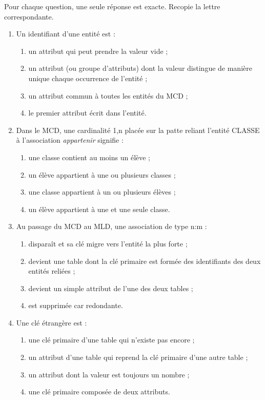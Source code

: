 \documentclass[11pt]{article}
\newcommand{\cle}[1]{{\popxbold\color{popdark}#1}}
\begin{document}
\begin{exercice}
Pour chaque question, une seule réponse est exacte. Recopie la lettre correspondante.

\begin{enumerate}
  \item Un \cle{identifiant} d'une entité est :
  \begin{enumerate}
    \item un attribut qui peut prendre la valeur vide ;
    \item un attribut (ou groupe d'attributs) dont la valeur distingue de manière unique chaque occurrence de l'entité ;
    \item un attribut commun à toutes les entités du MCD ;
    \item le premier attribut écrit dans l'entité.
  \end{enumerate}
  \item Dans le MCD, une \cle{cardinalité} 1,n placée sur la patte reliant l'entité CLASSE à l'association \emph{appartenir} signifie :
  \begin{enumerate}
    \item une classe contient au moins un élève ;
    \item un élève appartient à une ou plusieurs classes ;
    \item une classe appartient à un ou plusieurs élèves ;
    \item un élève appartient à une et une seule classe.
  \end{enumerate}
  \item Au passage du MCD au MLD, une association de type \cle{n:m} :
  \begin{enumerate}
    \item disparaît et sa clé migre vers l'entité la plus forte ;
    \item devient une table dont la clé primaire est formée des identifiants des deux entités reliées ;
    \item devient un simple attribut de l'une des deux tables ;
    \item est supprimée car redondante.
  \end{enumerate}
  \item Une \cle{clé étrangère} est :
  \begin{enumerate}
    \item une clé primaire d'une table qui n'existe pas encore ;
    \item un attribut d'une table qui reprend la clé primaire d'une autre table ;
    \item un attribut dont la valeur est toujours un nombre ;
    \item une clé primaire composée de deux attributs.
  \end{enumerate}
\end{enumerate}
\end{exercice}
\end{document}
